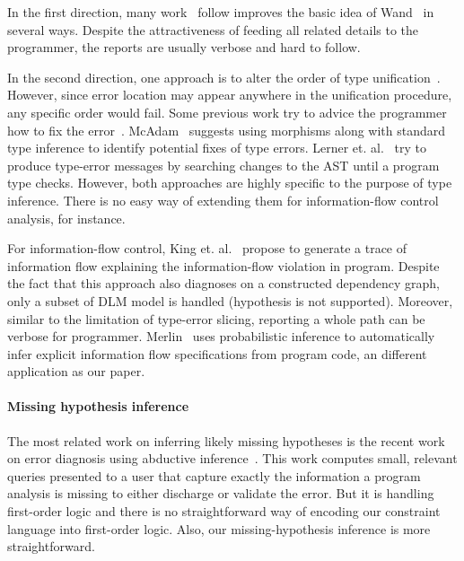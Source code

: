 In the first direction, many work~\cite{choppella95, haack:slicing,
tip:slicing} follow improves the basic idea of Wand~\cite{wand-errorfinding} in
several ways. Despite the attractiveness of feeding all related details to the
programmer, the reports are usually verbose and hard to follow.

In the second direction, one approach is to alter the order of type
unification~\cite{lee:toplas, mcadam:unification}. However, since error
location may appear anywhere in the unification procedure, any specific order
would fail. Some previous work try to advice the programmer how to fix the
error~\cite{mcadam:thesis, lerner:pldi07}. McAdam~\cite{mcadam:thesis} suggests
using morphisms along with standard type inference to identify potential fixes
of type errors. Lerner et. al.~\cite{lerner:pldi07} try to produce type-error
messages by searching changes to the AST until a program type checks. However,
both approaches are highly specific to the purpose of type inference. There is
no easy way of extending them for information-flow control analysis, for
instance.

For information-flow control, King et. al.~\cite{king:fse} propose to
generate a trace of information flow explaining the information-flow violation
in program. Despite the fact that this approach also diagnoses on a constructed
dependency graph, only a subset of DLM model is handled (hypothesis is not
supported). Moreover, similar to the limitation of type-error slicing,
reporting a whole path can be verbose for programmer.
Merlin~\cite{livshits:merlin} uses probabilistic inference to automatically
infer explicit information flow specifications from program code, an different
application as our paper.

\paragraph{Missing hypothesis inference}

The most related work on inferring likely missing hypotheses is the recent work
on error diagnosis using abductive inference~\cite{dillig:pldi12}. This work
computes small, relevant queries presented to a user that capture exactly the
information a program analysis is missing to either discharge or validate the
error. But it is handling first-order logic and there is no straightforward way
of encoding our constraint language into first-order logic. Also, our
missing-hypothesis inference is more straightforward.






